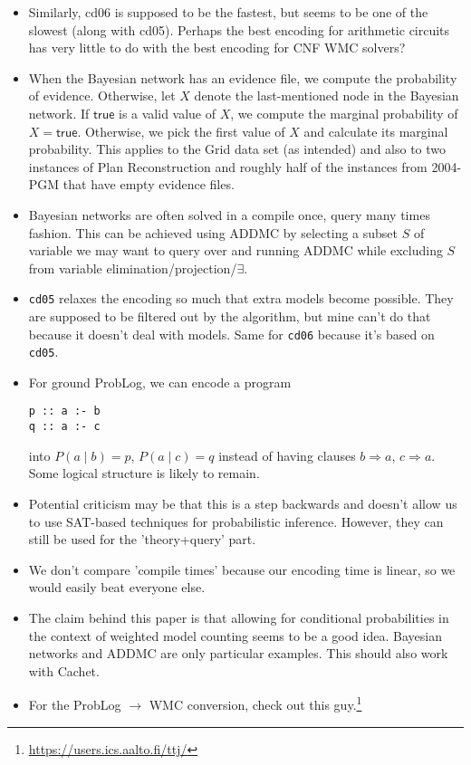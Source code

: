 \documentclass{article}
\theoremstyle{definition}
\theoremstyle{remark}
\begin{document}
\begin{itemize}
\item Similarly, cd06 is supposed to be the fastest, but seems to be one of the
  slowest (along with cd05). Perhaps the best encoding for arithmetic circuits
  has very little to do with the best encoding for CNF WMC solvers?
\item When the Bayesian network has an evidence file, we compute the probability
  of evidence. Otherwise, let $X$ denote the last-mentioned node in the Bayesian
  network. If $\mathsf{true}$ is a valid value of $X$, we compute the marginal
  probability of $X = \mathsf{true}$. Otherwise, we pick the first value of $X$
  and calculate its marginal probability. This applies to the Grid data set (as
  intended) and also to two instances of Plan Reconstruction and roughly half of
  the instances from 2004-PGM that have empty evidence files.
\item Bayesian networks are often solved in a compile once, query many times
  fashion. This can be achieved using ADDMC by selecting a subset $S$ of
  variable we may want to query over and running ADDMC while excluding $S$ from
  variable elimination/projection/$\exists$.
\item \texttt{cd05} relaxes the encoding so much that extra models become
  possible. They are supposed to be filtered out by the algorithm, but mine
  can't do that because it doesn't deal with models. Same for \texttt{cd06}
  because it's based on \texttt{cd05}.
\item For ground ProbLog, we can encode a program
\begin{verbatim}
p :: a :- b
q :: a :- c
\end{verbatim}
  into $P(a \mid b)=p$, $P(a \mid c)=q$ instead of having clauses $b \Rightarrow
  a$, $c \Rightarrow a$. Some logical structure is likely to remain.
\item Potential criticism may be that this is a step backwards and doesn't allow
  us to use SAT-based techniques for probabilistic inference. However, they can
  still be used for the 'theory+query' part.
\item We don't compare 'compile times' because our encoding time is linear, so
  we would easily beat everyone else.
\item The claim behind this paper is that allowing for conditional probabilities
  in the context of weighted model counting seems to be a good idea. Bayesian
  networks and ADDMC are only particular examples. This should also work with
  Cachet.
\item For the ProbLog $\to$ WMC conversion, check out this
  guy.\footnote{\url{https://users.ics.aalto.fi/ttj/}}
\end{itemize}
\end{document}
